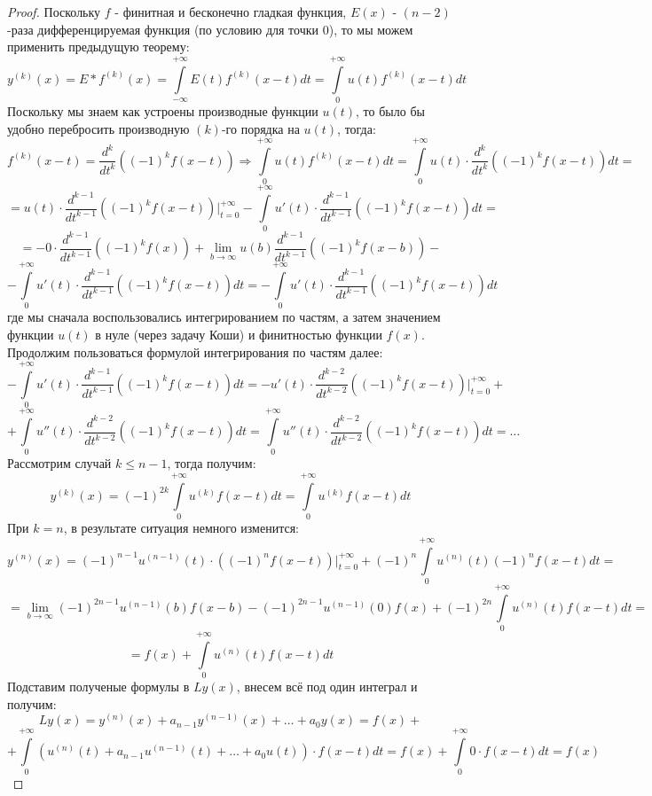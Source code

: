 \documentclass[12pt]{article}
\theoremstyle{definition}
\newcommand{\ddint}[2]{\displaystyle\int\limits_{#1}^{#2}}
\begin{document}
\begin{proof}
	Поскольку $f$ - финитная и бесконечно гладкая функция, $E(x)$ - $(n-2)$-раза дифференцируемая функция (по условию для точки $0$), то мы можем применить предыдущую теорему:
	$$
		y^{(k)}(x) = E*f^{(k)}(x) = \ddint{-\infty}{+\infty}E(t)f^{(k)}(x-t)dt = \ddint{0}{+\infty}u(t)f^{(k)}(x-t)dt
	$$
	Поскольку мы знаем как устроены производные функции $u(t)$, то было бы удобно перебросить производную $(k)$-го порядка на $u(t)$, тогда:
	$$
		f^{(k)}(x-t) = \dfrac{d^k}{dt^k}\left((-1)^kf(x-t)\right) \Rightarrow \ddint{0}{+\infty}u(t)f^{(k)}(x-t)dt = \ddint{0}{+\infty}u(t){\cdot}\dfrac{d^k}{dt^k}\left((-1)^kf(x-t)\right)dt =
	$$
	$$
		= u(t){\cdot}\dfrac{d^{k-1}}{dt^{k-1}}\left((-1)^kf(x-t)\right)\Big|_{t= 0}^{+\infty} - \ddint{0}{+\infty}u'(t){\cdot}\dfrac{d^{k-1}}{dt^{k-1}}\left((-1)^kf(x-t)\right)dt = 
	$$
	$$	
		= - 0{\cdot}\dfrac{d^{k-1}}{dt^{k-1}}\left((-1)^kf(x)\right) + \lim\limits_{b\to \infty}u(b)\dfrac{d^{k-1}}{dt^{k-1}}\left((-1)^kf(x-b)\right) -
	$$
	$$
		- \ddint{0}{+\infty}u'(t){\cdot}\dfrac{d^{k-1}}{dt^{k-1}}\left((-1)^kf(x-t)\right)dt =	- \ddint{0}{+\infty}u'(t){\cdot}\dfrac{d^{k-1}}{dt^{k-1}}\left((-1)^kf(x-t)\right)dt
	$$
	где мы сначала воспользовались интегрированием по частям, а затем значением функции $u(t)$ в нуле (через задачу Коши) и финитностью функции $f(x)$. Продолжим пользоваться формулой интегрирования по частям далее:
	$$
		-\ddint{0}{+\infty}u'(t){\cdot}\dfrac{d^{k-1}}{dt^{k-1}}\left((-1)^kf(x-t)\right)dt =  -u'(t){\cdot}\dfrac{d^{k-2}}{dt^{k-2}}\left((-1)^kf(x-t)\right)\Big|_{t= 0}^{+\infty} +
	$$
	$$
		+ \ddint{0}{+\infty}u''(t){\cdot}\dfrac{d^{k-2}}{dt^{k-2}}\left((-1)^kf(x-t)\right)dt = \ddint{0}{+\infty}u''(t){\cdot}\dfrac{d^{k-2}}{dt^{k-2}}\left((-1)^kf(x-t)\right)dt = \dotsc
	$$
	Рассмотрим случай $k \leq n-1$, тогда получим:
	$$
		y^{(k)}(x) = (-1)^{2k}\ddint{0}{+\infty}u^{(k)}f(x-t)dt = \ddint{0}{+\infty}u^{(k)}f(x-t)dt
	$$
	При $k = n$, в результате ситуация немного изменится:
	$$
		y^{(n)}(x) = (-1)^{n-1}u^{(n-1)}(t){\cdot}\left((-1)^nf(x-t)\right)\Big|_{t= 0}^{+\infty} + (-1)^n\ddint{0}{+\infty}u^{(n)}(t)(-1)^nf(x-t)dt =
	$$
	$$
		=\lim\limits_{b \to \infty}(-1)^{2n -1}u^{(n-1)}(b)f(x-b) - (-1)^{2n-1}u^{(n-1)}(0)f(x) + (-1)^{2n}\ddint{0}{+\infty}u^{(n)}(t)f(x-t)dt =
	$$
	$$
		= f(x) + \ddint{0}{+\infty}u^{(n)}(t)f(x-t)dt
	$$
	Подставим полученые формулы в $Ly(x)$, внесем всё под один интеграл и получим:
	$$
		Ly(x) = y^{(n)}(x) + a_{n-1} y^{(n-1)}(x) + \dotsc + a_0 y(x) = f(x) +
	$$
	$$
		+  \ddint{0}{+\infty}\left(u^{(n)}(t) + a_{n-1}u^{(n-1)}(t) + \dotsc + a_0 u(t)\right){\cdot}f(x-t)dt = f(x) + \ddint{0}{+\infty}0{\cdot}f(x-t)dt = f(x)
	$$
\end{proof}
\end{document}
